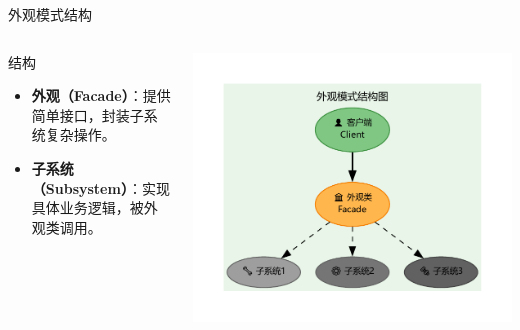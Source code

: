 \documentclass[UTF8,aspectratio=169]{beamer}
\begin{document}
\begin{frame}{外观模式结构}
    \begin{columns}
        \begin{column}{0.48\textwidth}
            \begin{ytublock}{结构}
                \begin{itemize}
                    \item \textbf{外观（Facade）}：提供简单接口，封装子系统复杂操作。
                    \item \textbf{子系统（Subsystem）}：实现具体业务逻辑，被外观类调用。
                \end{itemize}
            \end{ytublock}
        \end{column}
        \begin{column}{0.48\textwidth}
            \includegraphics[width=1.0\textwidth]{images/facade_pattern.pdf}
        \end{column}
    \end{columns}
\end{frame}
\end{document}
